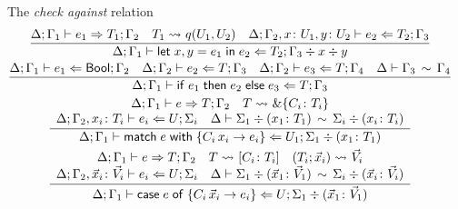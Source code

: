 \begin{figure}[t]
  The \emph{check against} relation\hfill{}
  \begin{gather*}
    \frac{
      \algtypeout[\kindEnv ; \varEnv_1]{e_1}{T_1}{\varEnv_2}
      \quad
      T_1 \Extract{} q(U_1, U_2)
      \quad
      \algtypein[\kindEnv; \varEnv_2, x\colon U_1, y\colon U_2]{e_2}{T_2}{\varEnv_3}
    }{
      \algtypein[\kindEnv;
      \varEnv_1]{\binlete{x}{y}{e_1}{e_2}}{T_2}{\varEnv_3} \div x \div y
    }
    \\
    \frac{
      \algtypein[\kindEnv;\varEnv_1]{e_1}{\boolt}{\varEnv_2}
      \quad
      \algtypein[\kindEnv;\varEnv_2]{e_2}{T}{\varEnv_3}
      \quad
      \algtypein[\kindEnv;\varEnv_2]{e_3}{T}{\varEnv_4}
      \quad
      \ctxequiv{\varEnv_3}{\varEnv_4}
    }{
      \algtypein[\kindEnv;\varEnv_1]{\conditionale{e_1}{e_2}{e_3}}{T}{\varEnv_3}
    }
    \\
    \frac{
      \begin{array}{c}
        \algtypeout[\kindEnv;\varEnv_1]{e}{T}{\varEnv_2}
        \quad
        T \Extract{} \&\{C_i\colon T_i\}
        \\
        \algtypein[\kindEnv;\varEnv_2, x_i\colon T_i]{e_i}{U}{\Sigma_i}
        \quad
        \ctxequiv{\Sigma_1 \div (x_1\colon T_1)}{\Sigma_i \div (x_i\colon T_i)} 
      \end{array}
    }{
      \algtypein[\kindEnv;\varEnv_1]{\matche{e}{\{C_i\,x_i
          \rightarrow e_i\}}}{U_1}{\Sigma_1 \div (x_1\colon T_1)}
    }
    \\
    \frac{
      \begin{array}{c}
        \algtypeout[\kindEnv;\varEnv_1]{e}{T}{\varEnv_2}
        \quad
        T \Extract{}[C_i\colon T_i]
        \quad
        (T_i;\vec x_i) \Extract{}{\vec V_i}
        \\
        \algtypein[\kindEnv;\varEnv_2, \vec x_i\colon\vec V_i]{e_i}{U}{\Sigma_i}
        \quad
        \ctxequiv{\Sigma_1 \div (\vec x_1\colon\vec V_1)}{\Sigma_i \div (\vec x_i\colon\vec V_i)} 
      \end{array}
    }{
      \algtypein[\kindEnv;\varEnv_1]{\casee{e}{\{C_i\,\vec x_i\rightarrow e_i\}}}{U}{\Sigma_1 \div (\vec x_1\colon\vec V_1)}
}
\end{gather*}
\end{figure}
